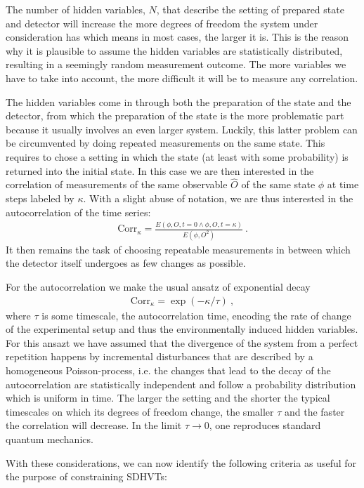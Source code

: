 \documentclass[12pt]{article}                    %
\newcommand{\beqn}{\begin{eqnarray}}
\newcommand{\eeqn}{\end{eqnarray}}
\begin{document}
The number of hidden variables, $N$, that describe the setting of prepared state and detector
will increase the more degrees of freedom the system under consideration has which means
in most cases, the larger it is. This is the reason
why it is plausible to assume the hidden variables are statistically distributed,
resulting in a seemingly random measurement outcome. The more variables we have to
take into account, the more difficult it will be to measure any correlation. 

The
hidden variables come in through both the preparation of the state and the detector,
from which the preparation of the state is the more problematic part because it
usually involves an even larger system. Luckily, this latter problem can be circumvented
by doing repeated measurements on the same state. This requires to chose a setting
in which the state (at least with some probability) is returned into the initial state.
In this case we are then interested in the correlation of measurements of the
same observable $\hat O$ of the same state $\phi$ at time steps labeled by $\kappa$.
With a slight abuse of notation, we are thus interested in the autocorrelation of
the time series:
\beqn
{\mathrm{Corr}}_\kappa = \frac{E(\phi, O, t=0 \wedge \phi, O, t=\kappa )}{E(\phi, O^2)}~.
\eeqn
It then remains the task of
choosing repeatable measurements in between which the detector itself undergoes as few 
changes as possible. 

For the autocorrelation we make the usual ansatz of exponential decay
\beqn
{\mathrm{Corr}}_\kappa = \exp \left( - \kappa/\tau \right) ~,
\eeqn
where $\tau$ is some timescale, the autocorrelation time, encoding the rate of change of the experimental
setup and thus the environmentally induced hidden variables. For this ansazt we have assumed that the
divergence of the system from a perfect repetition happens by incremental disturbances that are described 
by a homogeneous Poisson-process, i.e. the changes that lead to the decay of the autocorrelation 
are statistically independent and follow a probability distribution
which is uniform in time. The larger the setting and the shorter the typical timescales on which its degrees of freedom change, 
the smaller $\tau$ and the faster the correlation will decrease. In the limit $\tau \to 0$,
one reproduces standard quantum mechanics. 

With these considerations, we can now identify the following criteria as useful for the 
purpose of constraining {\sc SDHVT}s:
\end{document}
